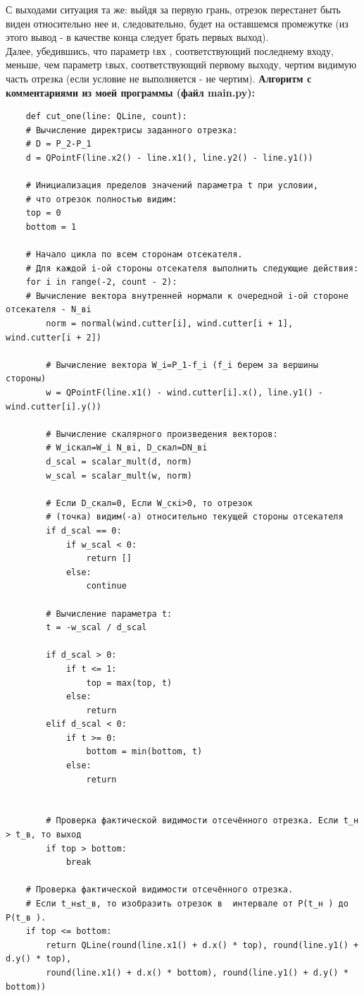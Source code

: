 \documentclass[a4paper,12pt]{article}
\begin{document}
	С выходами ситуация та же: выйдя за первую грань, отрезок перестанет быть виден относительно нее и, следовательно, будет на оставшемся промежутке (из этого вывод - в качестве конца следует брать первых выход).\\
	
	Далее, убедившись, что параметр tвх , соответствующий последнему входу, меньше, чем параметр tвых, соответствующий первому выходу, чертим видимую часть отрезка (если условие не выполняется - не чертим).
	\newpage
	\noindent\textbf{Алгоритм с комментариями из моей программы (файл main.py):}
	
	
	\begin{verbatim}
	def cut_one(line: QLine, count):
	# Вычисление директрисы заданного отрезка:
	# D = P_2-P_1
	d = QPointF(line.x2() - line.x1(), line.y2() - line.y1())
	
	# Инициализация пределов значений параметра t при условии,
	# что отрезок полностью видим:
	top = 0
	bottom = 1
	
	# Начало цикла по всем сторонам отсекателя.
	# Для каждой i-ой стороны отсекателя выполнить следующие действия:
	for i in range(-2, count - 2):
	# Вычисление вектора внутренней нормали к очередной i-ой стороне отсекателя - N_вi
		norm = normal(wind.cutter[i], wind.cutter[i + 1], wind.cutter[i + 2])
	
		# Вычисление вектора W_i=P_1-f_i (f_i берем за вершины стороны)
		w = QPointF(line.x1() - wind.cutter[i].x(), line.y1() - wind.cutter[i].y())
	
		# Вычисление скалярного произведения векторов:
		# W_iскал=W_i N_вi, D_скал=DN_вi
		d_scal = scalar_mult(d, norm)
		w_scal = scalar_mult(w, norm)
		
		# Если D_скал=0, Если W_скi>0, то отрезок
		# (точка) видим(-а) относительно текущей стороны отсекателя
		if d_scal == 0:
			if w_scal < 0:
				return []
			else:
				continue
	
		# Вычисление параметра t:
		t = -w_scal / d_scal
	
		if d_scal > 0:
			if t <= 1:
				top = max(top, t)
			else:
				return
		elif d_scal < 0:
			if t >= 0:
				bottom = min(bottom, t)
			else:
				return
	
	
		# Проверка фактической видимости отсечённого отрезка. Если t_н > t_в, то выход
		if top > bottom:
			break
	
	# Проверка фактической видимости отсечённого отрезка.
	# Если t_н≤t_в, то изобразить отрезок в  интервале от P(t_н ) до P(t_в ).
	if top <= bottom:
		return QLine(round(line.x1() + d.x() * top), round(line.y1() + d.y() * top),
		round(line.x1() + d.x() * bottom), round(line.y1() + d.y() * bottom))
	\end{verbatim}
	
\end{document}
